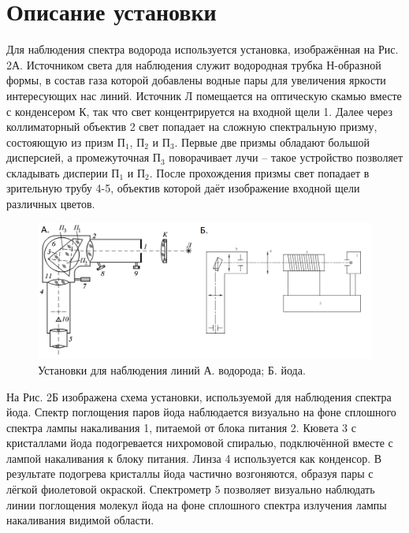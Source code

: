 \documentclass[a4paper,12pt]{article}
\begin{document}
\section*{Описание установки}
Для наблюдения спектра водорода используется установка, изображённая на Рис. 2А. Источником света для наблюдения служит водородная трубка Н-образной формы, в состав газа которой добавлены водные пары для увеличения яркости интересующих нас линий. Источник Л помещается на оптическую скамью вместе с конденсером К, так что свет концентрируется на входной щели 1. Далее через коллиматорный объектив 2 свет попадает на сложную спектральную призму, состояющую из призм П$_1$, П$_2$ и П$_3$. Первые две призмы обладают большой дисперсией, а промежуточная П$_3$ поворачивает лучи -- такое устройство позволяет складывать дисперии П$_1$ и П$_2$. После прохождения призмы свет попадает в зрительную трубу 4-5, объектив которой даёт изображение входной щели различных цветов.
\newpage
\begin{figure}[h]
\includegraphics[scale=0.5]{2.png}
\centering
\caption{Установки для наблюдения линий А. водорода; Б. йода.}
\end{figure} 
На Рис. 2Б изображена схема установки, используемой для наблюдения спектра йода. Спектр поглощения паров йода наблюдается визуально на фоне сплошного спектра лампы накаливания 1, питаемой от блока питания 2. Кювета 3 с кристаллами йода подогревается нихромовой спиралью, подключённой вместе с лампой накаливания к блоку питания. Линза 4 используется как конденсор. В результате подогрева кристаллы йода частично возгоняются, образуя пары
с лёгкой фиолетовой окраской. Спектрометр 5 позволяет визуально наблюдать линии поглощения молекул йода на фоне сплошного спектра излучения лампы накаливания видимой области.
\end{document}
